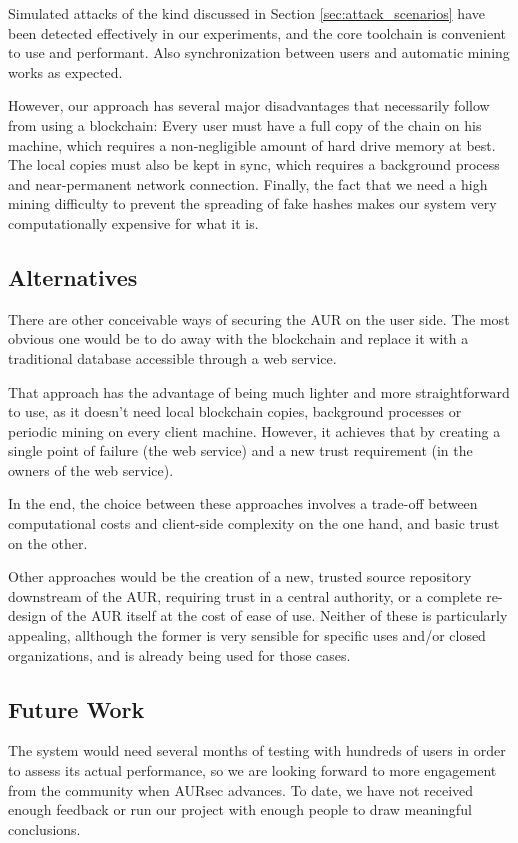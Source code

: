 \label{sec:discuss}
Simulated attacks of the kind discussed in Section \ref{sec:attack_scenarios} have been detected effectively in our experiments, and the core toolchain is convenient to use and performant.
Also synchronization between users and automatic mining works as expected.

However, our approach has several major disadvantages that necessarily follow from using a blockchain: Every user must have a full copy of the chain on his machine, which requires a non-negligible amount of hard drive memory at best.
The local copies must also be kept in sync, which requires a background process and near-permanent network connection.
Finally, the fact that we need a high mining difficulty to prevent the spreading of fake hashes makes our system very computationally expensive for what it is.

\subsection{Alternatives}
There are other conceivable ways of securing the AUR on the user side.
The most obvious one would be to do away with the blockchain and replace it with a traditional database accessible through a web service.

That approach has the advantage of being much lighter and more straightforward to use, as it doesn't need local blockchain copies, background processes or periodic mining on every client machine. However, it achieves that by creating a single point of failure (the web service) and a new trust requirement (in the owners of the web service).

In the end, the choice between these approaches involves a trade-off between computational costs and client-side complexity on the one hand, and basic trust on the other.

Other approaches would be the creation of a new, trusted source repository downstream of the AUR, requiring trust in a central authority, or a complete re-design of the AUR itself at the cost of ease of use. Neither of these is particularly appealing, allthough the former is very sensible for specific uses and/or closed organizations, and is already being used for those cases.


\subsection{Future Work}
The system would need several months of testing with hundreds of users in order to assess its actual performance, so we are looking forward to more engagement from the community when AURsec advances.
To date, we have not received enough feedback or run our project with enough people to draw meaningful conclusions.

